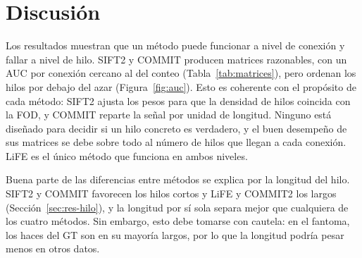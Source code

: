 \documentclass[11pt,a4paper]{article}
\begin{document}

\section{Discusión}
Los resultados muestran que un método puede funcionar a nivel de conexión y fallar a nivel de hilo. SIFT2 y COMMIT producen matrices razonables, con un AUC por conexión cercano al del conteo (Tabla~\ref{tab:matrices}), pero ordenan los hilos por debajo del azar (Figura~\ref{fig:auc}). Esto es coherente con el propósito de cada método: SIFT2 ajusta los pesos para que la densidad de hilos coincida con la FOD, y COMMIT reparte la señal por unidad de longitud. Ninguno está diseñado para decidir si un hilo concreto es verdadero, y el buen desempeño de sus matrices se debe sobre todo al número de hilos que llegan a cada conexión. LiFE es el único método que funciona en ambos niveles.

Buena parte de las diferencias entre métodos se explica por la longitud del hilo. SIFT2 y COMMIT favorecen los hilos cortos y LiFE y COMMIT2 los largos (Sección~\ref{sec:res-hilo}), y la longitud por sí sola separa mejor que cualquiera de los cuatro métodos. Sin embargo, esto debe tomarse con cautela: en el fantoma, los haces del GT son en su mayoría largos, por lo que la longitud podría pesar menos en otros datos.
\end{document}
